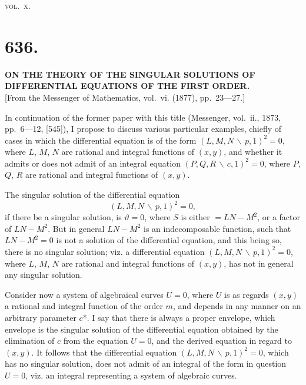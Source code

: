 \documentclass[11pt,a4paper]{book}
\begin{document}
\hfill\textsc{vol.~x.}

\clearpage
\setcounter{page}{19}

\section*{636.}

\begin{center}
\textbf{ON THE THEORY OF THE SINGULAR SOLUTIONS OF DIFFERENTIAL EQUATIONS OF THE FIRST ORDER.}\\[1em]
[From the Messenger of Mathematics, vol.~vi. (1877), pp.~23---27.]
\end{center}

In continuation of the former paper with this title (Messenger, vol.~ii., 1873, pp.~6---12, [545]), I propose to discuss various particular examples, chiefly of cases in which the differential equation is of the form $(L, M, N \,\backslash\, p, 1)^2 = 0$, where $L$, $M$, $N$ are rational and integral functions of $(x, y)$, and whether it admits or does not admit of an integral equation $(P, Q, R \,\backslash\, c, 1)^2 = 0$, where $P$, $Q$, $R$ are rational and integral functions of $(x, y)$.

The singular solution of the differential equation
\[
(L, M, N \,\backslash\, p, 1)^2 = 0,
\]
if there be a singular solution, is $\vartheta = 0$, where $S$ is either $= LN - M^2$, or a factor of $LN - M^2$. But in general $LN - M^2$ is an indecomposable function, such that $LN - M^2 = 0$ is not a solution of the differential equation, and this being so, there is no singular solution; viz. a differential equation $(L, M, N \,\backslash\, p, 1)^2 = 0$, where $L$, $M$, $N$ are rational and integral functions of $(x, y)$, has not in general any singular solution.

Consider now a system of algebraical curves $U = 0$, where $U$ is as regards $(x, y)$ a rational and integral function of the order $m$, and depends in any manner on an arbitrary parameter $c$*. I say that there is always a proper envelope, which envelope is the singular solution of the differential equation obtained by the elimination of $c$ from the equation $U = 0$, and the derived equation in regard to $(x, y)$. It follows that the differential equation $(L, M, N \,\backslash\, p, 1)^2 = 0$, which has no singular solution, does not admit of an integral of the form in question $U = 0$, viz. an integral representing a system of algebraic curves.
\end{document}
